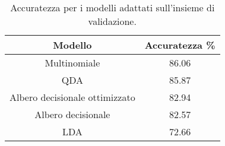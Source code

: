 \begin{table}[H]
\centering
\caption{Accuratezza per i modelli adattati sull'insieme di validazione.}
\begin{tabular}{cc}
\toprule
                        Modello &  Accuratezza \% \\
\midrule
                   Multinomiale &          86.06 \\
                            QDA &          85.87 \\
 Albero decisionale ottimizzato &          82.94 \\
             Albero decisionale &          82.57 \\
                            LDA &          72.66 \\
\bottomrule
\end{tabular}
\label{tab:acc}
\end{table}